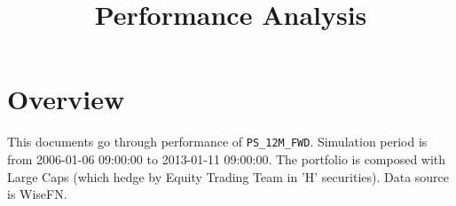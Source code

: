 \documentclass{article}
\begin{document}




\title{Performance Analysis}
\author{}
\date{}

\maketitle


\section{Overview}
This documents go through performance of \verb|PS_12M_FWD|. Simulation period is from 2006-01-06 09:00:00 to 2013-01-11 09:00:00. The portfolio is composed with Large Caps (which hedge by Equity Trading Team in 'H' securities). Data source is WiseFN.
\end{document}
